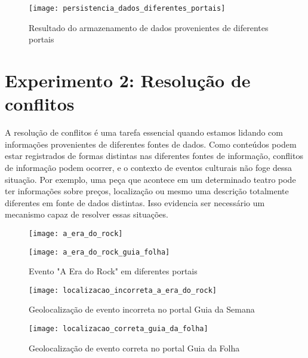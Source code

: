 \begin{figure}[!ht]
  \centering
  \texttt{[image: persistencia\_dados\_diferentes\_portais]} 
  \caption{Resultado do armazenamento de dados provenientes de diferentes portais}
  \label{fig:persistencia_dados_diferentes_portais} 
\end{figure}

\section{Experimento 2: Resolução de conflitos}
\label{sec:resolucao_de_conflitos_mesmo_evento}

A resolução de conflitos é uma tarefa essencial quando estamos lidando com informações provenientes de diferentes fontes de dados. Como conteúdos podem estar registrados de formas distintas nas diferentes fontes de informação, conflitos de informação podem ocorrer, e o contexto de eventos culturais não foge dessa situação. Por exemplo, uma  peça que acontece em um determinado teatro pode ter informações sobre preços, localização ou mesmo uma descrição totalmente diferentes em  fonte de dados distintas. Isso evidencia ser necessário um mecanismo capaz de resolver essas situações.

\begin{figure}[!ht]
\centering
  \begin{minipage}{.45\linewidth}
    \centering
    \texttt{[image: a\_era\_do\_rock]} 
    \label{fig:a_era_do_rock}
  \end{minipage}
  \begin{minipage}{.45\linewidth}
    \centering
    \texttt{[image: a\_era\_do\_rock\_guia\_folha]}
    \label{fig:a_era_do_rock_guia_folha}
  \end{minipage}
  \caption{Evento "A Era do Rock" em diferentes portais}
  \label{fig:era_do_rock_dois_portais}
\end{figure}

\begin{figure}[!ht]
  \centering
  \texttt{[image: localizacao\_incorreta\_a\_era\_do\_rock]} 
  \caption{Geolocalização de evento incorreta no portal Guia da Semana}
  \label{fig:localizacao_incorreta_a_era_do_rock} 
\end{figure}

\begin{figure}[!ht]
  \centering
  \texttt{[image: localizacao\_correta\_guia\_da\_folha]} 
  \caption{Geolocalização de evento correta no portal Guia da Folha}
  \label{fig:localizacao_correta_guia_da_folha} 
\end{figure}

